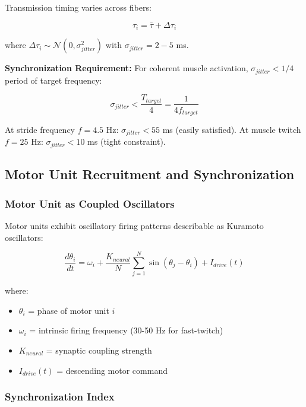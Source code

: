 Transmission timing varies across fibers:

\begin{equation}
\tau_i = \bar{\tau} + \Delta\tau_i
\label{eq:transmission_jitter}
\end{equation}

where $\Delta\tau_i \sim \mathcal{N}(0, \sigma_{jitter}^2)$ with $\sigma_{jitter} = 2-5$ ms.

\textbf{Synchronization Requirement:} For coherent muscle activation, $\sigma_{jitter} < 1/4$ period of target frequency:

\begin{equation}
\sigma_{jitter} < \frac{T_{target}}{4} = \frac{1}{4 f_{target}}
\label{eq:synchronization_requirement}
\end{equation}

At stride frequency $f = 4.5$ Hz: $\sigma_{jitter} < 55$ ms (easily satisfied).
At muscle twitch $f = 25$ Hz: $\sigma_{jitter} < 10$ ms (tight constraint).

\subsection{Motor Unit Recruitment and Synchronization}

\subsubsection{Motor Unit as Coupled Oscillators}

Motor units exhibit oscillatory firing patterns describable as Kuramoto oscillators:

\begin{equation}
\frac{d\theta_i}{dt} = \omega_i + \frac{K_{neural}}{N} \sum_{j=1}^{N} \sin(\theta_j - \theta_i) + I_{drive}(t)
\label{eq:motor_unit_kuramoto}
\end{equation}

where:
\begin{itemize}
\item $\theta_i$ = phase of motor unit $i$
\item $\omega_i$ = intrinsic firing frequency (30-50 Hz for fast-twitch)
\item $K_{neural}$ = synaptic coupling strength
\item $I_{drive}(t)$ = descending motor command
\end{itemize}

\subsubsection{Synchronization Index}

